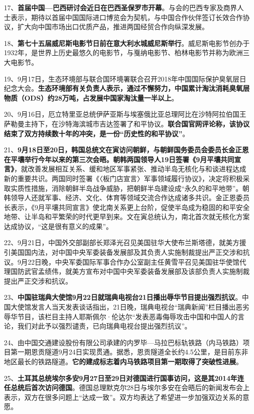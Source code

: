 17、{\textbf{首届中国---巴西研讨会近日在巴西圣保罗市开幕}}。与会的巴西专家及商界人士表示，期待以首届中国国际进口博览会为契机，与中国合作伙伴签订长效合作协议，扩大向中国市场出口优质产品，推进两国经贸合作向纵深发展。

18、{\textbf{第七十五届威尼斯电影节日前在意大利水城威尼斯举行}}。威尼斯电影节创办于1932年，是世界上历史最悠久的电影节，与戛纳电影节、柏林电影节并称为欧洲三大电影节。

19、9月17日，生态环境部与联合国环境署联合召开2018年中国国际保护臭氧层日纪念大会。{\textbf{生态环境部有关负责人表示，通过不懈努力，中国累计淘汰消耗臭氧层物质（ODS）约28万吨，占发展中国家淘汰量一半以上}}。

20、9月16日，厄立特里亚总统伊萨亚斯与埃塞俄比亚总理阿比在沙特阿拉伯国王萨勒曼主持下，在沙特海滨城市吉达签署了和平协议。{\textbf{联合国官网评论称，该协议结束了双方持续数十年的冲突，是一份``历史性的和平协议''}}。

21、{\textbf{9月18日至20日，韩国总统文在寅访问朝鲜，与朝鲜国务委员会委员长金正恩在平壤举行今年以来的第三次会晤。朝韩两国领导人19日签署《9月平壤共同宣言》}}，就改善发展相互关系、缓和地区军事紧张、推动半岛无核化与和谈进程达成新的重要共识。两国同时签署《〈板门店宣言〉军事领域履行协议》，决定将积极采取实质性措施，消除朝鲜半岛战争威胁，把朝鲜半岛建设成``永久的和平地带''。朝韩领导人还就军事、经济、文化、体育等领域交流合作达成诸多共识。金正恩委员长表示，《9月平壤共同宣言》使北南关系更上台阶，促使半岛成为稳固的和平安全地带、让半岛和平繁荣的时代更早到来。文在寅总统认为，南北首次就无核化方案达成协议，``这是很有意义的成果''。

22、9月21日，中国外交部副部长郑泽光召见美国驻华大使布兰斯塔德，就美方援引美国国内法，对中国中央军委装备发展部及其负责人实施制裁提出严正交涉和抗议。9月22日晚，中央军委国际军事合作办公室副主任黄雪平召见美国驻华使馆代理国防武官孟绩伟，就美方宣布对中国中央军委装备发展部及该部负责人实施制裁提出严正交涉和抗议。

23、{\textbf{中国驻瑞典大使馆9月22日就瑞典电视台21日播出辱华节目提出强烈抗议}}。中国大使馆发言人当天发表谈话指出，21日晚，瑞典电视台``瑞典新闻''栏目播出恶劣辱华节目，该栏目主持人耶斯佩尔·伦达尔``发表恶毒侮辱攻击中国和中国人的言论，我们对此予以强烈谴责，已向瑞典电视台提出强烈抗议''。

24、由中国交通建设股份有限公司承建的内罗毕---马拉巴标轨铁路（内马铁路）项目第一期恩贡隧道9月24日实现贯通。据悉，恩贡隧道全长约4.5公里，是目前东非地区最长的铁路隧道。{\textbf{它的建成标志着内马铁路项目第一期取得了突破性进展}}。

25、{\textbf{土耳其总统埃尔多安9月27日至29日对德国进行国事访问，这是其2014年连任总统后首次访问德国}}。德国总理默克尔28日与埃尔多安在会晤后的新闻发布会上表示，双方在很多问题上``达成一致''。双方均表达了希望进一步加强双边关系的意愿。
